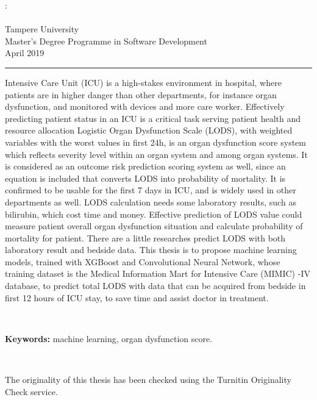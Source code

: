 \documentclass[12pt,a4paper,english
]{tunithesis}
\begin{document}
\begin{spacing}{1.0}
\noindent \@author: \@title\\
\@thesistype\\
Tampere University\\
Master’s Degree Programme in Software Development\\
April 2019
\end{spacing}
\noindent\rule{12cm}{0.4pt}

\vspace{0.5cm}


\noindent Intensive Care Unit (ICU) is a high-stakes environment in hospital, where patients are in higher danger than other departments, for instance organ dysfunction, and monitored with devices and more care worker. Effectively predicting patient status in an ICU is a critical task serving patient health and resource allocation Logistic Organ Dysfunction Scale (LODS), with weighted variables with the worst values in first 24h, is an organ dysfunction score system which reflects severity level within an organ system and among organ systems. It is considered as an outcome risk prediction scoring system as well, since an equation is included that converts LODS into probability of mortality. It is confirmed to be usable for the first 7 days in ICU, and is widely used in other departments as well. LODS calculation needs some laboratory results, such as bilirubin, which cost time and money. Effective prediction of LODS value could measure patient overall organ dysfunction situation and calculate probability of mortality for patient.
\noindent There are a little researches predict LODS with both laboratory result and bedside data. This thesis is to propose machine learning models, trained with XGBoost and Convolutional Neural Network, whose training dataset is the Medical Information Mart for Intensive Care (MIMIC) -IV database, to predict total LODS with data that can be acquired from bedside in first 12 hours of ICU stay, to save time and assist doctor in treatment. 




~

\noindent\textbf{Keywords:} machine learning, organ dysfunction score.

~

\noindent The originality of this thesis has been checked using the Turnitin Originality Check service.
\end{document}
